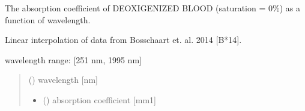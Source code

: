 \documentclass[letterpaper,10pt,english]{sphinxmanual}
\begin{document}

\begin{fulllineitems}
\label{\detokenize{03_absorption_coefficient:skinoptics.absorption_coefficient.mua_deo_Bosschaart}}
\pysigstartsignatures
{}
\pysigstopsignatures
\begin{DUlineblock}{0em}
\item[] The absorption coefficient of DEOXIGENIZED BLOOD (saturation = 0\%) as a function of wavelength.
\item[] Linear interpolation of data from Bosschaart et. al. 2014 {[}B*14{]}.
\end{DUlineblock}

\begin{DUlineblock}{0em}
\item[] wavelength range: {[}251 nm, 1995 nm{]}
\end{DUlineblock}
\begin{quote}\begin{description}
\sphinxAtStartPar
{} () \textendash{} wavelength {[}nm{]}

\sphinxAtStartPar
\begin{itemize}
\item {} 
\sphinxAtStartPar
{} () \textendash{} absorption coefficient {[}mm\sphinxhyphen{}1{]}

\end{itemize}


\end{description}\end{quote}

\end{fulllineitems}

\end{document}
